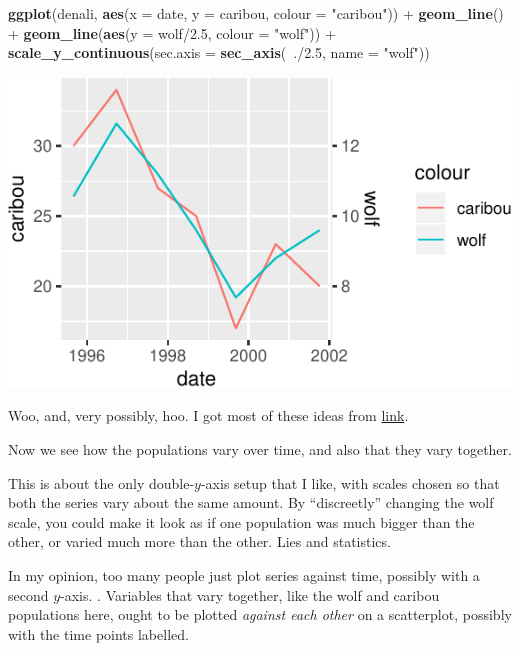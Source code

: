 \documentclass[]{tufte-book}
\newenvironment{Shaded}{}{}
\newcommand{\DataTypeTok}[1]{\textcolor[rgb]{0.56,0.13,0.00}{#1}}
\newcommand{\FloatTok}[1]{\textcolor[rgb]{0.25,0.63,0.44}{#1}}
\newcommand{\KeywordTok}[1]{\textcolor[rgb]{0.00,0.44,0.13}{\textbf{#1}}}
\newcommand{\NormalTok}[1]{#1}
\newcommand{\OperatorTok}[1]{\textcolor[rgb]{0.40,0.40,0.40}{#1}}
\newcommand{\StringTok}[1]{\textcolor[rgb]{0.25,0.44,0.63}{#1}}
\theoremstyle{definition}
\theoremstyle{definition}
\theoremstyle{definition}
\theoremstyle{remark}
\begin{document}
\begin{Shaded}
\begin{Highlighting}[]
\KeywordTok{ggplot}\NormalTok{(denali, }\KeywordTok{aes}\NormalTok{(}\DataTypeTok{x =}\NormalTok{ date, }\DataTypeTok{y =}\NormalTok{ caribou, }\DataTypeTok{colour =} \StringTok{"caribou"}\NormalTok{)) }\OperatorTok{+}\StringTok{ }
\StringTok{    }\KeywordTok{geom_line}\NormalTok{() }\OperatorTok{+}\StringTok{ }\KeywordTok{geom_line}\NormalTok{(}\KeywordTok{aes}\NormalTok{(}\DataTypeTok{y =}\NormalTok{ wolf}\OperatorTok{/}\FloatTok{2.5}\NormalTok{, }
    \DataTypeTok{colour =} \StringTok{"wolf"}\NormalTok{)) }\OperatorTok{+}\StringTok{ }\KeywordTok{scale_y_continuous}\NormalTok{(}\DataTypeTok{sec.axis =} \KeywordTok{sec_axis}\NormalTok{(}\OperatorTok{~}\NormalTok{.}\OperatorTok{/}\FloatTok{2.5}\NormalTok{, }
    \DataTypeTok{name =} \StringTok{"wolf"}\NormalTok{))}
\end{Highlighting}
\end{Shaded}

\includegraphics{13-dates-and-times_files/figure-latex/unnamed-chunk-41-1}

Woo, and, very possibly, hoo. I got most of these ideas from
\href{https://rpubs.com/MarkusLoew/226759}{link}.

Now we see how the populations vary over time, and also that they vary
together.

This is about the only double-\(y\)-axis setup that I like, with scales
chosen so that both the series vary about the same amount. By
``discreetly'' changing the wolf scale, you could make it look as if one
population was much bigger than the other, or varied much more than the
other. Lies and statistics.

In my opinion, too many people just plot series against time, possibly
with a second \(y\)-axis.
. Variables that vary
together, like the wolf and caribou populations here, ought to be
plotted \emph{against each
other} on a scatterplot, possibly with the time points labelled.
\end{document}
